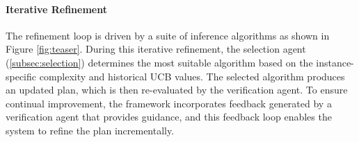 \paragraph{Iterative Refinement}
The refinement loop is driven by a suite of inference algorithms as shown in Figure \ref{fig:teaser}. During this iterative refinement, the selection agent (\textsection \ref{subsec:selection}) determines the most suitable algorithm based on the instance-specific complexity and historical UCB values. The selected algorithm produces an updated plan, which is then re-evaluated by the verification agent. To ensure continual improvement, the framework incorporates feedback generated by a verification agent that provides guidance, and this feedback loop enables the system to refine the plan incrementally.




